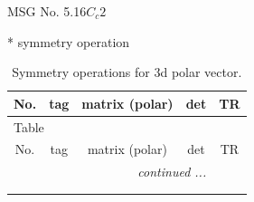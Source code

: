 \documentclass[fleqn,8pt]{jsarticle}
\begin{document}
\setcounter{MaxMatrixCols}{32}

\renewcommand{\tablename}{Table~}
\renewcommand{\figurename}{Figure~}
\begin{center}
\LARGE
MSG No. 5.16\quad$C_{c}2$
\end{center}
* symmetry operation
\renewcommand{\arraystretch}{1.3}
\begin{longtable}{ccccc}
\caption{Symmetry operations for 3d polar vector.}
 \\
 \hline \hline
No. & tag & matrix (polar) & det & TR \\ \hline \endfirsthead

\multicolumn{4}{l}{\tablename\ \thetable{}} \\
 \hline \hline
No. & tag & matrix (polar) & det & TR \\ \hline \endhead

 \hline \hline
\multicolumn{4}{r}{\footnotesize\it continued ...} \\ \endfoot

 \hline \hline
\multicolumn{4}{r}{} \\ \endlastfoot


\end{longtable}
\end{document}
